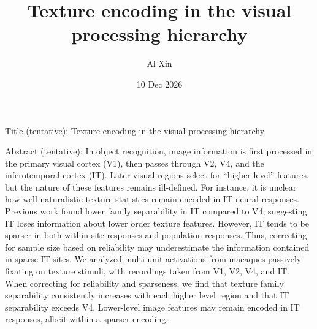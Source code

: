 \documentclass[draft]{cmustatproposal} %
\title{Texture encoding in the visual processing hierarchy}
\author{Al Xin}
\date{10 Dec 2026}
\begin{document}
Title (tentative): Texture encoding in the visual processing hierarchy

Abstract (tentative): In object recognition, image information is first processed in the primary visual cortex (V1), then passes through V2, V4, and the inferotemporal cortex (IT). Later visual regions select for ``higher-level'' features, but the nature of these features remains ill-defined. For instance, it is unclear how well naturalistic texture statistics remain encoded in IT neural responses. Previous work found lower family separability in IT compared to V4, suggesting IT loses information about lower order texture features. However, IT tends to be sparser in both within-site responses and population responses. Thus, correcting for sample size based on reliability may underestimate the information contained in sparse IT sites. We analyzed multi-unit activations from macaques passively fixating on texture stimuli, with recordings taken from V1, V2, V4, and IT. When correcting for reliability and sparseness, we find that texture family separability consistently increases with each higher level region and that IT separability exceeds V4. Lower-level image features may remain encoded in IT responses, albeit within a sparser encoding.
\end{document}
